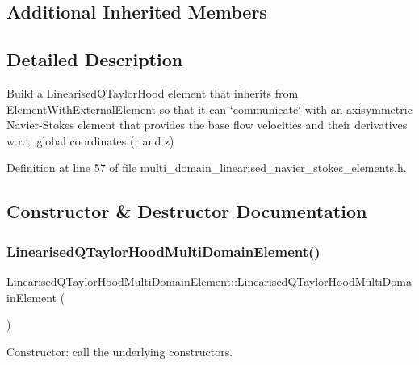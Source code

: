 \subsection*{Additional Inherited Members}


\subsection{Detailed Description}
Build a Linearised\+Q\+Taylor\+Hood element that inherits from Element\+With\+External\+Element so that it can \char`\"{}communicate\char`\"{} with an axisymmetric Navier-\/\+Stokes element that provides the base flow velocities and their derivatives w.\+r.\+t. global coordinates (r and z) 

Definition at line 57 of file multi\+\_\+domain\+\_\+linearised\+\_\+navier\+\_\+stokes\+\_\+elements.\+h.



\subsection{Constructor \& Destructor Documentation}
\mbox{\label{classLinearisedQTaylorHoodMultiDomainElement_a0aa0d2d9684c13b02ef9fe19bed8dca1}} 
\subsubsection{\texorpdfstring{Linearised\+Q\+Taylor\+Hood\+Multi\+Domain\+Element()}{LinearisedQTaylorHoodMultiDomainElement()}}
{\footnotesize\ttfamily Linearised\+Q\+Taylor\+Hood\+Multi\+Domain\+Element\+::\+Linearised\+Q\+Taylor\+Hood\+Multi\+Domain\+Element (\begin{DoxyParamCaption}{ }\end{DoxyParamCaption})\hspace{0.3cm}{\ttfamily [inline]}}



Constructor\+: call the underlying constructors. 

